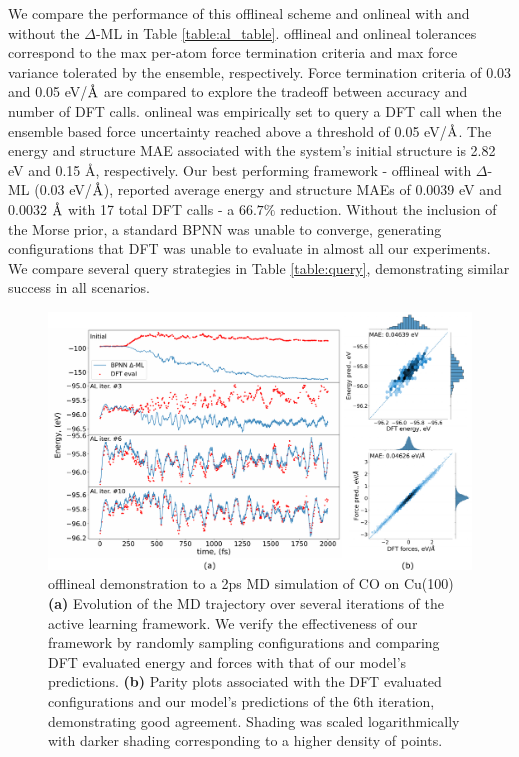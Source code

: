 \documentclass[
 reprint,
 amsmath,
 amssymb,
 aps,
]{revtex4-1}
\newcommand{\ang}{\mbox{\normalfont\AA}}
\begin{document}
We compare the performance of this \gls{offlineal} scheme and \gls{onlineal} with and without the $\Delta$-ML in Table \ref{table:al_table}. \gls{offlineal} and \gls{onlineal} tolerances correspond to the max per-atom force termination criteria and max force variance tolerated by the ensemble, respectively. Force termination criteria of 0.03 and 0.05 eV/$\ang$ are compared to explore the tradeoff between accuracy and number of DFT calls. \gls{onlineal} was empirically set to query a DFT call when the ensemble based force uncertainty reached above a threshold of 0.05 eV/$\ang$. The energy and structure MAE associated with the system's initial structure is 2.82 eV and 0.15 \ang, respectively. Our best performing framework - \gls{offlineal} with $\Delta$-ML (0.03 eV/$\ang$), reported average energy and structure MAEs of 0.0039 eV and 0.0032 $\ang$ with 17 total DFT calls - a $66.7\%$ reduction. Without the inclusion of the Morse prior, a standard BPNN was unable to converge, generating configurations that DFT was unable to evaluate in almost all our experiments. We compare several query strategies in Table \ref{table:query}, demonstrating similar success in all scenarios.

\begin{figure}[ht]
    \centering
    \includegraphics[width=\textwidth]{figures/figure_4.pdf}
    \caption{ \gls{offlineal} demonstration to a 2ps MD simulation of CO on Cu(100) \textbf{(a)} Evolution of the MD trajectory over several iterations of the active learning framework. We verify the effectiveness of our framework by randomly sampling configurations and comparing DFT evaluated energy and forces with that of our model's predictions. \textbf{(b)} Parity plots associated with the DFT evaluated configurations and our model's predictions of the 6th iteration, demonstrating good agreement. Shading was scaled logarithmically with darker shading corresponding to a higher density of points. 
    }
    \label{fig:al_md}
\end{figure}
\end{document}
